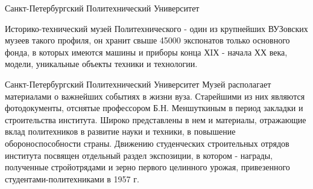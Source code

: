 \documentclass[xcolor=dvipsnames,12pt]{beamer}
\begin{document}
\begin{frame}{Санкт-Петербургский Политехнический Университет}

\begin{center}
\end{center}

Историко-технический музей Политехнического - один из крупнейших ВУЗовских музеев такого профиля, он хранит свыше 45000 экспонатов только основного фонда, в которых имеются машины и приборы конца ХIХ - начала ХХ века, модели, уникальные объекты техники и технологии.
\end{frame}

\begin{frame}{Санкт-Петербургский Политехнический Университет}
 Музей располагает материалами о важнейших событиях в жизни вуза. Старейшими из них являются фотодокументы, отснятые профессором Б.Н. Меншуткиным в период закладки и строительства института. Широко представлены в нем и материалы, отражающие вклад политехников в развитие науки и техники, в повышение обороноспособности страны. Движению студенческих строительных отрядов института посвящен отдельный раздел экспозиции, в котором - награды, полученные стройотрядами и зерно первого целинного урожая, привезенного студентами-политехниками в 1957 г.
\end{frame}
\end{document}
